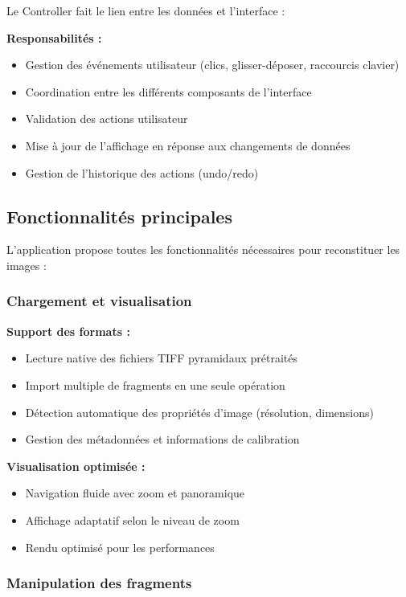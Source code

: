\documentclass[11pt,a4paper]{report}
\begin{document}
Le Controller fait le lien entre les données et l'interface :

\textbf{Responsabilités :}
\begin{itemize}
\item Gestion des événements utilisateur (clics, glisser-déposer, raccourcis clavier)
\item Coordination entre les différents composants de l'interface
\item Validation des actions utilisateur
\item Mise à jour de l'affichage en réponse aux changements de données
\item Gestion de l'historique des actions (undo/redo)
\end{itemize}

\subsection{Fonctionnalités principales}

L'application propose toutes les fonctionnalités nécessaires pour reconstituer les images :

\subsubsection{Chargement et visualisation}

\textbf{Support des formats :}
\begin{itemize}
\item Lecture native des fichiers TIFF pyramidaux prétraités
\item Import multiple de fragments en une seule opération
\item Détection automatique des propriétés d'image (résolution, dimensions)
\item Gestion des métadonnées et informations de calibration
\end{itemize}

\textbf{Visualisation optimisée :}
\begin{itemize}
\item Navigation fluide avec zoom et panoramique
\item Affichage adaptatif selon le niveau de zoom
\item Rendu optimisé pour les performances
\end{itemize}

\subsubsection{Manipulation des fragments}
\end{document}
